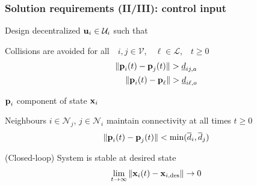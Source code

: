 \begin{frame} %
  \frametitle{Solution requirements (II/III): control input}

  \begin{gg_box}
  Design decentralized $\bm{\mathbf{u}}_i \in \mathcal{U}_i$ such that
  \end{gg_box}

  \begin{wideitemize}

    \item Collisions are avoided for all\ \ $i,j \in \mathcal{V}$,\ \ $\ell \in \mathcal{L}$,\ \ $t \geq 0$
      \begin{align}
        \|\bm{\mathbf{p}}_i(t) - \bm{\mathbf{p}}_{j}(t)\| > \underline{d}_{ij,a} \\
        \|\bm{\mathbf{p}}_i(t) - \bm{\mathbf{p}}_\ell\| > \underline{d}_{i\ell,o}
      \end{align}

      $\bm{\mathbf{p}}_i$ component of state $\bm{\mathbf{x}}_i$\\[3ex]

    \item Neighbours $i \in \mathcal{N}_j$, $j \in \mathcal{N}_i$
      maintain connectivity at all times $t \geq 0$
      \begin{align}
        \|\bm{\mathbf{p}}_i(t) - \bm{\mathbf{p}}_{j}(t)\| < \text{min}(\overline{d}_{i}, \overline{d}_{j})
      \end{align}

    \item (Closed-loop) System is stable at desired state
      \begin{align}
        \lim\limits_{t \to \infty}\|\bm{\mathbf{x}}_i(t) - \bm{\mathbf{x}}_{i,\text{des}}\| \to 0 \\
      \end{align}

  \end{wideitemize}

\end{frame} %
